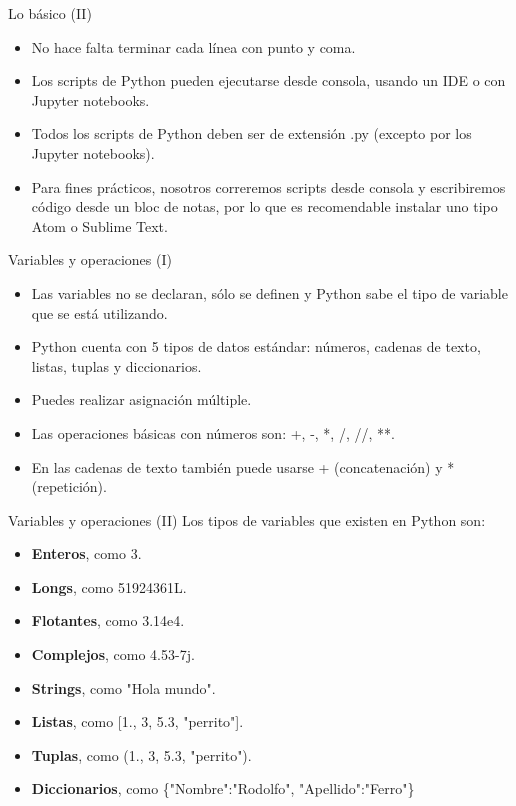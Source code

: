 \documentclass[usenames,dvipsnames]{beamer}
\begin{document}
  \begin{frame}{Lo básico (II)}
    \begin{itemize}
      \item No hace falta terminar cada línea con punto y coma.
      \item Los scripts de Python pueden ejecutarse desde consola, usando un IDE o con
      Jupyter notebooks.
      \item Todos los scripts de Python deben ser de extensión .py (excepto por los
      Jupyter notebooks).
      \item Para fines prácticos, nosotros correremos scripts desde consola y
      escribiremos código desde un bloc de notas, por lo que es recomendable
      instalar uno tipo Atom o Sublime Text.
    \end{itemize}
  \end{frame}

  \begin{frame}{Variables y operaciones (I)}
    \begin{itemize}
      \item Las variables no se declaran, sólo se definen y Python sabe el
      tipo de variable que se está utilizando.
      \item Python cuenta con 5 tipos de datos estándar: números, cadenas
      de texto, listas, tuplas y diccionarios.
      \item Puedes realizar asignación múltiple.
      \item Las operaciones básicas con números son: +, -, *, /, //, **.
      \item En las cadenas de texto también puede usarse + (concatenación)
      y * (repetición).
    \end{itemize}
  \end{frame}

  \begin{frame}{Variables y operaciones (II)}
    Los tipos de variables que existen en Python son:
    \begin{itemize}
      \item \textbf{Enteros}, como 3.
      \item \textbf{Longs}, como 51924361L.
      \item \textbf{Flotantes}, como 3.14e4.
      \item \textbf{Complejos}, como 4.53-7j.
      \item \textbf{Strings}, como "Hola mundo".
      \item \textbf{Listas}, como [1., 3, 5.3, "perrito"].
      \item \textbf{Tuplas}, como (1., 3, 5.3, "perrito").
      \item \textbf{Diccionarios}, como \{"Nombre":"Rodolfo", "Apellido":"Ferro"\}
    \end{itemize}
  \end{frame}
\end{document}
